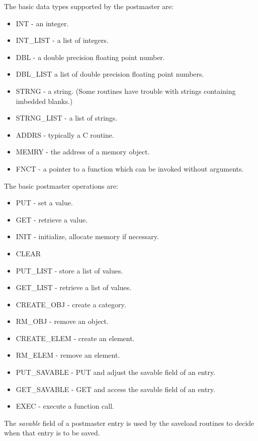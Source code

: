 The basic data types supported by the postmaster are:
\begin{itemize}
	\item INT - an integer.
	\item INT\_LIST - a list of integers.
	\item DBL - a double precision floating point number.
	\item DBL\_LIST a list of double precision floating point numbers.
	\item STRNG - a string. (Some routines have trouble with strings containing imbedded blanks.)
	\item STRNG\_LIST - a list of strings. 
	\item ADDRS - typically a C routine.
	\item MEMRY - the address of a memory object.
	\item FNCT - a pointer to a function which can be invoked without arguments.
\end{itemize}

The basic postmaster operations are:
\begin{itemize}
	\item PUT - set a value.
	\item GET - retrieve a value.
	\item INIT - initialize, allocate memory if necessary.
	\item CLEAR
	\item PUT\_LIST - store a list of values.
	\item GET\_LIST - retrieve a list of values.
	\item CREATE\_OBJ - create a category.
	\item RM\_OBJ - remove an object.
	\item CREATE\_ELEM - create an element.
	\item RM\_ELEM - remove an element.
	\item PUT\_SAVABLE - PUT and adjust the savable field of an entry.
	\item GET\_SAVABLE - GET and access the savable field of an entry.
	\item EXEC - execute a function call.
\end{itemize}

The {\em savable} field of a postmaster entry is used by the saveload
routines to decide when that entry is to be saved.

